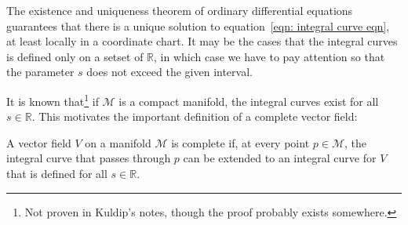     The existence and uniqueness theorem of ordinary differential equations
    guarantees that there is a unique solution to equation~\ref{eqn: integral curve eqn}, at least locally in a coordinate chart. It may be the cases that the integral curves is defined only on a setset of $\mathbb{R}$, in which case we have to pay attention so that the parameter $s$ does not exceed the given interval.

    It is known that\footnote{Not proven in Kuldip's notes, though the
    proof probably exists somewhere.} if $\mathcal{M}$ is a compact
    manifold, the integral curves exist for all $s \in \mathbb{R}$. This
    motivates the important definition of a complete vector field:

    \begin{definition}
      \label{complete vector field}
      A vector field $V$ on a manifold $\mathcal{M}$ is complete if, at
      every point $p \in \mathcal{M}$, the integral curve that passes
      through $p$ can be extended to an integral curve for $V$ that is
      defined for all $s \in \mathbb{R}$.
    \end{definition}
